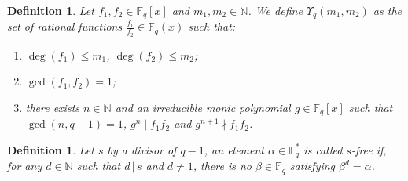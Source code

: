 \documentclass[12pt]{article}
\newtheorem{defin}[theorem]{Definition}
\newenvironment{definition}{\begin{defin}\em}{\end{defin}}
\newcommand{\F}{\mathbb{F}}
\def\Bb {\mathcal{B}}
\begin{document}
\begin{definition}  \label{upsilonset}
Let $f_1, f_2 \in \mathbb{F}_q [x]$ and $m_1,m_2 \in \mathbb{N}$.  We define  
$\Upsilon_{q} (m_1,m_2)$ as the set of rational functions 
$\frac{f_1}{f_2} \in \mathbb{F}_q(x)$
such that:
\begin{enumerate}  
\item[i)] 
$\deg (f_1) \leq m_1$,   $\deg (f_2) \leq m_2$; 
\item[ii)]
$\gcd(f_1,f_2)=1$;  
\item[iii)]
 there exists $n \in \mathbb{N}$ and an irreducible monic polynomial $g \in 
\F_q[x]$ such that $\gcd(n, q - 1)=1$, $g^n  \mid  f_1 f_2$ and 
$g^{n+1} \nmid f_1 f_2$. 
\end{enumerate}
\end{definition}
%
%


%
	

\begin{definition}
Let  $s$ by a divisor of $q-1$, an element $\alpha\in\mathbb{F}_q^*$
is called \textit{$s$-free} if, for any $d \in \mathbb{N}$ such that $d\, |\, s$ and $d \neq 1$, there is no $\beta\in\mathbb{F}_q$ satisfying $\beta^d = \alpha$.
\end{definition}
\end{document}
